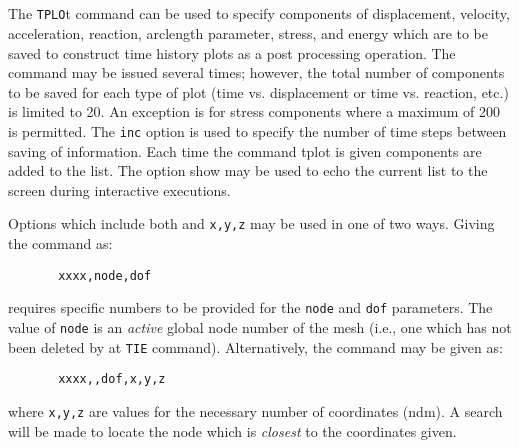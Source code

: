  \\{\smallskip}
 \\{\smallskip}
 \\{\smallskip}
 \\{\smallskip}
 \\{\smallskip}
 \\{\smallskip}
 \\{\smallskip}
 \\{\smallskip}
 \\{\smallskip}
\headb

The {\tt TPLO}t command can be used to specify components of
displacement, velocity, acceleration, reaction,
arclength parameter, stress, and
energy which are to be saved to construct time history plots as a
post processing operation.  The command may be issued
several times; however, the total number of components to be
saved for each type of plot (time vs. displacement or time
vs. reaction, etc.) is limited to 20.  An exception is for stress
components where a maximum of 200 is permitted.  The {\tt inc} option
is used to specify the number of time steps between saving of information.
Each time the command
tplot is given components are added to the list.  The option
show may be used to echo the current list to the screen during
interactive executions.

Options which include both {\tt} and {\tt x,y,z} may be used in one
of two ways.  Giving the command as:
\begin{verbatim}
       xxxx,node,dof
\end{verbatim}
requires specific numbers to be provided for the {\tt node} and {\tt dof}
parameters.  The value of {\tt node} is an {\it active}
global node number of the mesh (i.e., one which has not been deleted by
at {\tt TIE} command).  Alternatively, the command may be given as:
\begin{verbatim}
       xxxx,,dof,x,y,z
\end{verbatim}
where {\tt x,y,z} are values for the necessary number of coordinates (ndm).
A search will be made to locate the node which is {\it closest} to the
coordinates given.

